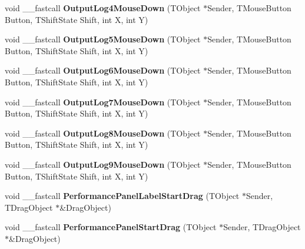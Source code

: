 \begin{DoxyCompactItemize}
\mbox{\label{class_t_interface_a0790ed90a42693837b0ade8eb266cf4f}} 
void \+\_\+\+\_\+fastcall {\bfseries Output\+Log4\+Mouse\+Down} (T\+Object $\ast$Sender, T\+Mouse\+Button Button, T\+Shift\+State Shift, int X, int Y)
\item 
\mbox{\label{class_t_interface_acf194f8c713c5097b526f77d38884e7a}} 
void \+\_\+\+\_\+fastcall {\bfseries Output\+Log5\+Mouse\+Down} (T\+Object $\ast$Sender, T\+Mouse\+Button Button, T\+Shift\+State Shift, int X, int Y)
\item 
\mbox{\label{class_t_interface_a762d579b6c0f8eab0cba73e8e39c4c8b}} 
void \+\_\+\+\_\+fastcall {\bfseries Output\+Log6\+Mouse\+Down} (T\+Object $\ast$Sender, T\+Mouse\+Button Button, T\+Shift\+State Shift, int X, int Y)
\item 
\mbox{\label{class_t_interface_ad2b9cecc582203955985af1f015dfd0c}} 
void \+\_\+\+\_\+fastcall {\bfseries Output\+Log7\+Mouse\+Down} (T\+Object $\ast$Sender, T\+Mouse\+Button Button, T\+Shift\+State Shift, int X, int Y)
\item 
\mbox{\label{class_t_interface_a8337441d3bf589ee560e216006b1a455}} 
void \+\_\+\+\_\+fastcall {\bfseries Output\+Log8\+Mouse\+Down} (T\+Object $\ast$Sender, T\+Mouse\+Button Button, T\+Shift\+State Shift, int X, int Y)
\item 
\mbox{\label{class_t_interface_a773e795f4faead1695d929f72537d4a1}} 
void \+\_\+\+\_\+fastcall {\bfseries Output\+Log9\+Mouse\+Down} (T\+Object $\ast$Sender, T\+Mouse\+Button Button, T\+Shift\+State Shift, int X, int Y)
\item 
\mbox{\label{class_t_interface_aa3dc1511a95c0cd529f8b64c1396567e}} 
void \+\_\+\+\_\+fastcall {\bfseries Performance\+Panel\+Label\+Start\+Drag} (T\+Object $\ast$Sender, T\+Drag\+Object $\ast$\&Drag\+Object)
\item 
\mbox{\label{class_t_interface_aaff75059b4aedd0d84190f3570d6ab6b}} 
void \+\_\+\+\_\+fastcall {\bfseries Performance\+Panel\+Start\+Drag} (T\+Object $\ast$Sender, T\+Drag\+Object $\ast$\&Drag\+Object)
\item 

\end{DoxyCompactItemize}
